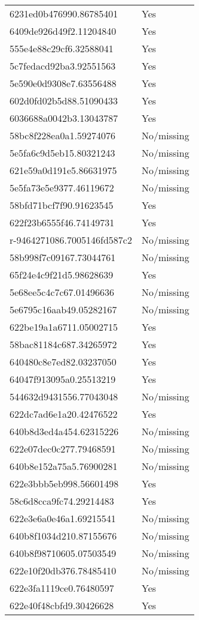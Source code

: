 \begin{tabular}{ll}
6231ed0b476990.86785401 & Yes \\
6409de926d49f2.11204840 & Yes \\
555e4e88c29cf6.32588041 & Yes \\
5c7fedacd92ba3.92551563 & Yes \\
5e590e0d9308e7.63556488 & Yes \\
602d0fd02b5d88.51090433 & Yes \\
6036688a0042b3.13043787 & Yes \\
58bc8f228ea0a1.59274076 & No/missing \\
5e5fa6c9d5eb15.80321243 & No/missing \\
621e59a0d191e5.86631975 & No/missing \\
5e5fa73e5e9377.46119672 & No/missing \\
58bfd71bcf7f90.91623545 & Yes \\
622f23b6555f46.74149731 & Yes \\
r-9464271086.7005146fd587c2 & No/missing \\
58b998f7c09167.73044761 & No/missing \\
65f24e4c9f21d5.98628639 & Yes \\
5e68ee5c4c7c67.01496636 & No/missing \\
5e6795c16aab49.05282167 & No/missing \\
622be19a1a6711.05002715 & Yes \\
58bac81184c687.34265972 & Yes \\
640480c8e7ed82.03237050 & Yes \\
64047f913095a0.25513219 & Yes \\
544632d9431556.77043048 & No/missing \\
622dc7ad6e1a20.42476522 & Yes \\
640b8d3ed4a454.62315226 & No/missing \\
622e07dec0c277.79468591 & No/missing \\
640b8e152a75a5.76900281 & No/missing \\
622e3bbb5eb998.56601498 & Yes \\
58c6d8cca9fc74.29214483 & Yes \\
622e3e6a0e46a1.69215541 & No/missing \\
640b8f1034d210.87155676 & No/missing \\
640b8f98710605.07503549 & No/missing \\
622e10f20db376.78485410 & No/missing \\
622e3fa1119ce0.76480597 & Yes \\
622e40f48cbfd9.30426628 & Yes \\

\end{tabular}
